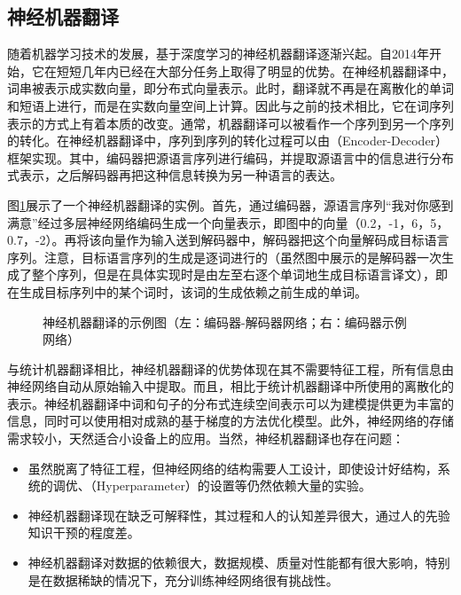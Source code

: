 \subsection{神经机器翻译}

\parinterval 随着机器学习技术的发展，基于深度学习的神经机器翻译逐渐兴起。自2014年开始，它在短短几年内已经在大部分任务上取得了明显的优势。在神经机器翻译中，词串被表示成实数向量，即分布式向量表示。此时，翻译就不再是在离散化的单词和短语上进行，而是在实数向量空间上计算。因此与之前的技术相比，它在词序列表示的方式上有着本质的改变。通常，机器翻译可以被看作一个序列到另一个序列的转化。在神经机器翻译中，序列到序列的转化过程可以由{\small{}}（Encoder-Decoder）框架实现。其中，编码器把源语言序列进行编码，并提取源语言中的信息进行分布式表示，之后解码器再把这种信息转换为另一种语言的表达。

\parinterval 图\ref{fig:1-15}展示了一个神经机器翻译的实例。首先，通过编码器，源语言序列“我对你感到满意”经过多层神经网络编码生成一个向量表示，即图中的向量（0.2，-1，6，5，0.7，-2）。再将该向量作为输入送到解码器中，解码器把这个向量解码成目标语言序列。注意，目标语言序列的生成是逐词进行的（虽然图中展示的是解码器一次生成了整个序列，但是在具体实现时是由左至右逐个单词地生成目标语言译文），即在生成目标序列中的某个词时，该词的生成依赖之前生成的单词。

\begin{figure}[htp]
    \centering

    \caption{神经机器翻译的示例图（左：编码器-解码器网络；右：编码器示例网络）}
    \label{fig:1-15}
\end{figure}

\parinterval 与统计机器翻译相比，神经机器翻译的优势体现在其不需要特征工程，所有信息由神经网络自动从原始输入中提取。而且，相比于统计机器翻译中所使用的离散化的表示。神经机器翻译中词和句子的分布式连续空间表示可以为建模提供更为丰富的信息，同时可以使用相对成熟的基于梯度的方法优化模型。此外，神经网络的存储需求较小，天然适合小设备上的应用。当然，神经机器翻译也存在问题：
\begin{itemize}
\vspace{0.5em}
\item 虽然脱离了特征工程，但神经网络的结构需要人工设计，即使设计好结构，系统的调优、{\small{}}（Hyperparameter）的设置等仍然依赖大量的实验。
\vspace{0.5em}
\item 神经机器翻译现在缺乏可解释性，其过程和人的认知差异很大，通过人的先验知识干预的程度差。
\vspace{0.5em}
\item 神经机器翻译对数据的依赖很大，数据规模、质量对性能都有很大影响，特别是在数据稀缺的情况下，充分训练神经网络很有挑战性。
\vspace{0.5em}
\end{itemize}

